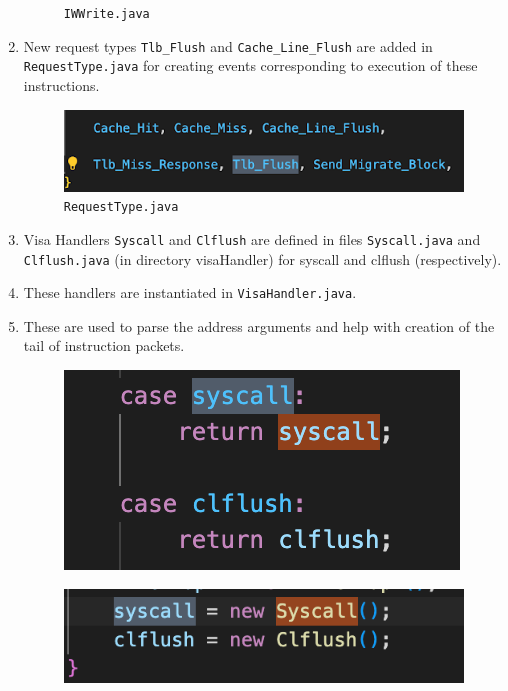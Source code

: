 \documentclass[11pt]{article}
\begin{document}
\begin{enumerate}
\begin{figure}[H]
\caption{\texttt{IWWrite.java}}
\label{fig:IWW1}
\end{figure}
    \item New request types \texttt{Tlb\_Flush} and \texttt{Cache\_Line\_Flush} are added in \texttt{RequestType.java} for creating events corresponding to execution of these instructions.
\begin{figure}[H]
\centering
\includegraphics[scale = 0.6]{screenshots/RequestType.png}
\caption{\texttt{RequestType.java}}
\label{fig:RT}
\end{figure}
    \item Visa Handlers  \texttt{Syscall} and \texttt{Clflush} are defined in files \texttt{Syscall.java} and \texttt{Clflush.java} (in directory visaHandler) for syscall and clflush  (respectively).
    \item These handlers are instantiated in \texttt{VisaHandler.java}.
    \item These are used to parse the address arguments and help with creation of the tail of instruction packets.
\begin{figure}
\centering
\begin{minipage}{.5\textwidth}
  \centering
  \includegraphics[width=0.55\linewidth]{screenshots/VisaHandler1.png}
  \label{fig:VH1}
\end{minipage}%
\begin{minipage}{.55\textwidth}
  \centering
  \includegraphics[width=1\linewidth]{screenshots/VisaHandler2.png}
  \label{fig:VH2}
\end{minipage}
\end{figure}   
\end{enumerate}
\end{document}
